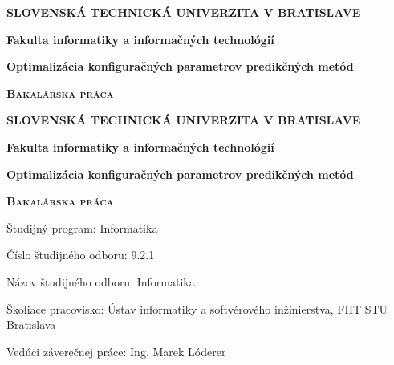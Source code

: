 \documentclass[a4paper,slovak,12pt,appendix]{article}
\begin{document}
\begin{titlepage}
	\centering
	{\large \textbf{SLOVENSKÁ TECHNICKÁ UNIVERZITA V BRATISLAVE} \par}
	\vspace{0.5cm}
	{\large \textbf{Fakulta informatiky a informačných technológií} \par}
	\vspace{6cm}
	{\huge\bfseries Optimalizácia konfiguračných parametrov predikčných metód \par}
	\vspace{2cm}
	{\scshape\large \textbf{Bakalárska práca} \par}
	\vspace{12.5cm}
	\vfill
\end{titlepage}

\begin{titlepage}
	\centering
	{\large \textbf{SLOVENSKÁ TECHNICKÁ UNIVERZITA V BRATISLAVE} \par}
	\vspace{0.5cm}
	{\large \textbf{Fakulta informatiky a informačných technológií} \par}
	\vspace{6cm}
	{\huge\bfseries Optimalizácia konfiguračných parametrov predikčných metód \par}
	\vspace{2cm}
	{\scshape\large \textbf{Bakalárska práca} \par}
	\vspace{5.5cm}
	\raggedright
	{\normalsize Študijný program: Informatika \par}
	{\normalsize Číslo študijného odboru: 9.2.1 \par}
	{\normalsize Názov študijného odboru: Informatika \par}
	{\normalsize Školiace pracovisko: Ústav informatiky a softvérového inžinierstva, FIIT STU Bratislava \par}
	{\normalsize Vedúci záverečnej práce: Ing. Marek Lóderer \par}
	\vspace{4.5cm}
\end{titlepage}

\end{document}
